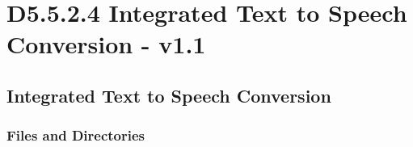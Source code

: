 \documentclass{CSSRforAfrica}
\begin{document}

\section{D5.5.2.4 Integrated Text to Speech Conversion - v1.1}

\subsection{Integrated Text to Speech Conversion}

\subsubsection{Files and Directories}
\end{document}
